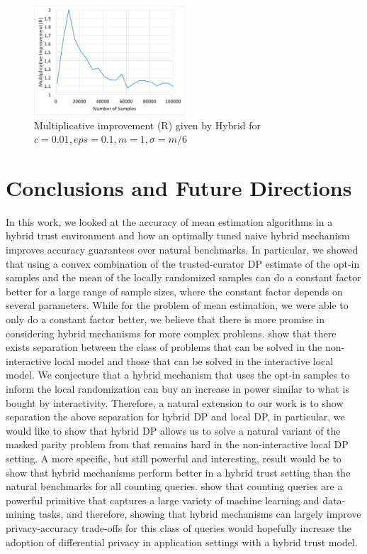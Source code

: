 \documentclass{article}
\theoremstyle{plain}
\begin{document}
\begin{figure}[h]
\includegraphics[width=0.5\textwidth]{imp_eps01c01.pdf}
\caption{Multiplicative improvement (R) given by Hybrid for $c=0.01, eps=0.1, m=1, \sigma = m/6$}
\end{figure}


\section{Conclusions and Future Directions}
In this work, we looked at the accuracy of mean estimation algorithms in a hybrid trust environment and how an optimally tuned naive hybrid mechanism improves accuracy guarantees over natural benchmarks. In particular, we showed that using a convex combination of the trusted-curator DP estimate of the opt-in samples and the mean of the locally randomized samples can do a constant factor better for a large range of sample sizes, where the constant factor depends on several parameters. While for the problem of mean estimation, we were able to only do a constant factor better, we believe that there is more promise in considering hybrid mechanisms for more complex problems. \cite{Kasiviswanathan:2011:WLP:2078965.2078976} show that there exists separation between the class of problems that can be solved in the non-interactive local model and those that can be solved in the interactive local model. We conjecture that a hybrid mechanism that uses the opt-in samples to inform the local randomization can buy an increase in power similar to what is bought by interactivity. Therefore, a natural extension to our work is to show separation the above separation for hybrid DP and local DP, in particular, we would like to show that hybrid DP allows us to solve a natural variant of the masked parity problem from \cite{Kasiviswanathan:2011:WLP:2078965.2078976} that remains hard in the non-interactive local DP setting. A more specific, but still powerful and interesting, result would be to show that hybrid mechanisms perform better in a hybrid trust setting than the natural benchmarks for all counting queries. \cite{Blum:2005:PPS:1065167.1065184} show that counting queries are a powerful primitive that captures a large variety of machine learning and data-mining tasks, and therefore, showing that hybrid mechanisms can largely improve privacy-accuracy trade-offs for this class of queries would hopefully increase the adoption of differential privacy in application settings with a hybrid trust model. 

\small


\end{document}
